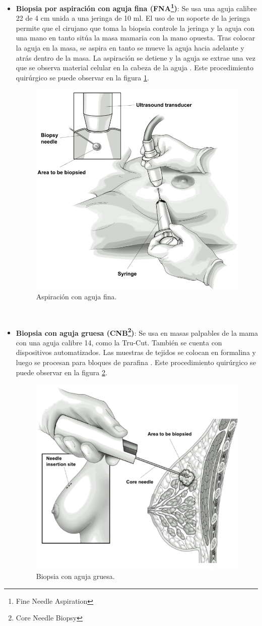 \begin{itemize}[label=\HandRight]
	\item \textbf{Biopsia por aspiración con aguja fina (FNA\footnote{Fine Needle Aspiration})}: Se usa una aguja calibre 22 de 4 cm unida a una jeringa de 10 ml. El uso de un soporte de la jeringa permite que el cirujano que toma la biopsia controle la jeringa y la aguja con una mano en tanto sitúa la masa mamaria con la mano opuesta. Tras colocar la aguja en la masa, se aspira en tanto se mueve la aguja hacia adelante y atrás dentro de la masa. La aspiración se detiene y la aguja se extrae una vez que se observa material celular en la cabeza de la aguja \cite{Brunicardi2010}. Este procedimiento quirúrgico se puede observar en la figura \ref{FNB}.
	\begin{figure}[!htb]
		\centering
		\includegraphics[width=0.5
		\linewidth]{IMAGENES/FNB}
		\caption{Aspiración con aguja fina\cite{FNB}.}
		\label{FNB}
	\end{figure}	
	\\
	
	\item \textbf{Biopsia con aguja gruesa (CNB\footnote{Core Needle Biopsy})}: Se usa en masas palpables de la mama con una aguja calibre 14, como la Tru-Cut. También se cuenta con dispositivos automatizados. Las muestras de tejidos se colocan en formalina y luego se procesan para bloques de parafina \cite{Brunicardi2010}. Este procedimiento quirúrgico se puede observar en la figura \ref{CNB}.
	\begin{figure}[!htb]
		\centering
		\includegraphics[width=0.5
		\linewidth]{IMAGENES/CNB}
		\caption{Biopsia con aguja gruesa\cite{CNB}.}
		\label{CNB}
	\end{figure}	
\end{itemize}

